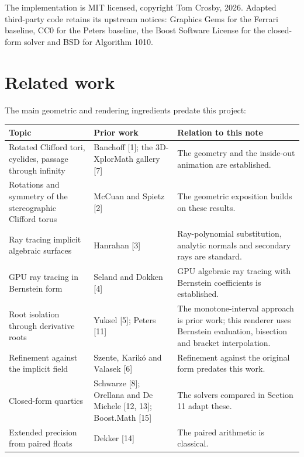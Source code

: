 \documentclass[11pt,a4paper]{article}
\begin{document}
The implementation is MIT licensed, copyright Tom Crosby, 2026. Adapted
third-party code retains its upstream notices: Graphics Gems for the
Ferrari baseline, CC0 for the Peters baseline, the Boost Software
License for the closed-form solver and BSD for Algorithm 1010.

\section{Related work}\label{related-work}

The main geometric and rendering ingredients predate this project:

{
\begin{longtable}[]{@{}
  >{\raggedright\arraybackslash}p{}
  >{\raggedright\arraybackslash}p{}
  >{\raggedright\arraybackslash}p{}@{}}
\toprule\noalign{}
\begin{minipage}[b]{\linewidth}\raggedright
Topic
\end{minipage} & \begin{minipage}[b]{\linewidth}\raggedright
Prior work
\end{minipage} & \begin{minipage}[b]{\linewidth}\raggedright
Relation to this note
\end{minipage} \\
\midrule\noalign{}
\endhead
\bottomrule\noalign{}
\endlastfoot
Rotated Clifford tori, cyclides, passage through infinity & Banchoff
{[}1{]}; the 3D-XplorMath gallery {[}7{]} & The geometry and the
inside-out animation are established. \\
Rotations and symmetry of the stereographic Clifford torus & McCuan and
Spietz {[}2{]} & The geometric exposition builds on these results. \\
Ray tracing implicit algebraic surfaces & Hanrahan {[}3{]} &
Ray-polynomial substitution, analytic normals and secondary rays are
standard. \\
GPU ray tracing in Bernstein form & Seland and Dokken {[}4{]} & GPU
algebraic ray tracing with Bernstein coefficients is established. \\
Root isolation through derivative roots & Yuksel {[}5{]}; Peters
{[}11{]} & The monotone-interval approach is prior work; this renderer
uses Bernstein evaluation, bisection and bracket interpolation. \\
Refinement against the implicit field & Szente, Karikó and Valasek
{[}6{]} & Refinement against the original form predates this work. \\
Closed-form quartics & Schwarze {[}8{]}; Orellana and De Michele {[}12,
13{]}; Boost.Math {[}15{]} & The solvers compared in Section 11 adapt
these. \\
Extended precision from paired floats & Dekker {[}14{]} & The paired
arithmetic is classical. \\
\end{longtable}
}
\end{document}
